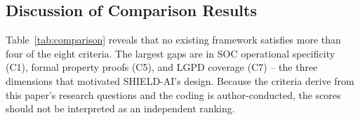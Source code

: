 \documentclass[journal]{IEEEtran}
\begin{document}
\begin{table}[!t]
\renewcommand{\arraystretch}{1.15}
\caption{Comparison of SHIELD-AI with related governance frameworks. \checkmark = fully
addressed; $\circ$ = partially addressed; $\times$ = not addressed.}
\label{tab:comparison}
\centering
\scriptsize
{}
\end{table}

\subsection{Discussion of Comparison Results}
Table~\ref{tab:comparison} reveals that no existing framework satisfies more than four
of the eight criteria. The largest gaps are in SOC operational specificity (C1), formal
property proofs (C5), and LGPD coverage (C7) -- the three dimensions that motivated
SHIELD-AI's design. Because the criteria derive from this paper's research questions and the
coding is author-conducted, the scores should not be interpreted as an independent ranking.
\end{document}
